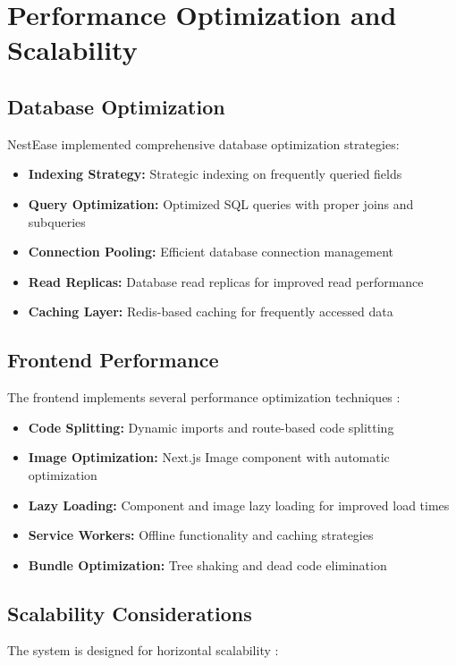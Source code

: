 \documentclass[conference]{IEEEtran}
\begin{document}
\section{Performance Optimization and Scalability}
\subsection{Database Optimization}
NestEase implemented comprehensive database optimization strategies:

\begin{itemize}
    \item \textbf{Indexing Strategy:} Strategic indexing on frequently queried fields
    \item \textbf{Query Optimization:} Optimized SQL queries with proper joins and subqueries
    \item \textbf{Connection Pooling:} Efficient database connection management
    \item \textbf{Read Replicas:} Database read replicas for improved read performance
    \item \textbf{Caching Layer:} Redis-based caching for frequently accessed data
\end{itemize}

\subsection{Frontend Performance}
The frontend implements several performance optimization techniques \cite{performance_optimization}:

\begin{itemize}
    \item \textbf{Code Splitting:} Dynamic imports and route-based code splitting
    \item \textbf{Image Optimization:} Next.js Image component with automatic optimization
    \item \textbf{Lazy Loading:} Component and image lazy loading for improved load times
    \item \textbf{Service Workers:} Offline functionality and caching strategies
    \item \textbf{Bundle Optimization:} Tree shaking and dead code elimination
\end{itemize}

\subsection{Scalability Considerations}
The system is designed for horizontal scalability \cite{scalability_patterns}:
\end{document}
